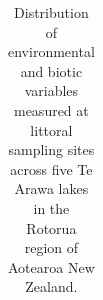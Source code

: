 \documentclass[
  12pt,
  a4paper,
  oneside]{scrbook}
\begin{document}
{

\begin{longtable}[]{@{}
  >{\raggedright\arraybackslash}p{}
  >{\raggedright\arraybackslash}p{}
  >{\raggedright\arraybackslash}p{}
  >{\raggedleft\arraybackslash}p{}
  >{\raggedleft\arraybackslash}p{}
  >{\raggedleft\arraybackslash}p{}
  >{\raggedleft\arraybackslash}p{}
  >{\raggedleft\arraybackslash}p{}
  >{\raggedleft\arraybackslash}p{}
  >{\raggedleft\arraybackslash}p{}@{}}

\caption{\label{tbl-env-fish-summary}Distribution of environmental and
biotic variables measured at littoral sampling sites across five Te
Arawa lakes in the Rotorua region of Aotearoa New Zealand.}

\tabularnewline


\end{longtable}}
\end{document}
